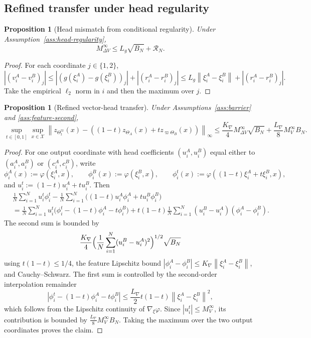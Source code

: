 \documentclass[11pt]{article}
\newtheorem{proposition}[theorem]{Proposition}
\theoremstyle{definition}
\newcommand{\norm}[1]{\left\lVert #1 \right\rVert}
\newcommand{\abs}[1]{\left\lvert #1 \right\rvert}
\newcommand{\mc}[1]{\mathcal{#1}}
\begin{document}
\subsection{Refined transfer under head regularity}

\begin{proposition}[Head mismatch from conditional regularity]
\label{prop:head-mismatch-regular}
Under Assumption~\ref{ass:head-regularity},
\begin{equation}
  M_{\Delta V}^\infty
  \le
  L_g\sqrt{B_N}+\mc{R}_N.
  \label{eq:head-mismatch-regular}
\end{equation}
\end{proposition}

\begin{proof}
For each coordinate $j\in\{1,2\}$,
\[
  \abs{(v_i^A-v_i^B)_j}
  \le
  \abs{(g(\xi_i^A)-g(\xi_i^B))_j}
  +
  \abs{(r_i^A-r_i^B)_j}
  \le
  L_g\norm{\xi_i^A-\xi_i^B}+\abs{(r_i^A-r_i^B)_j}.
\]
Take the empirical $\ell_2$ norm in $i$ and then the maximum over $j$.
\end{proof}

\begin{proposition}[Refined vector-head transfer]
\label{prop:refined-transfer}
Under Assumptions~\ref{ass:barrier} and \ref{ass:feature-second},
\begin{equation}
  \sup_{t\in[0,1]}\sup_{x\in\mc{X}}
  \norm{z_{\Theta_t^\varpi}(x)-((1-t)z_{\Theta_A}(x)+t z_{\varpi\Theta_B}(x))}_\infty
  \le
  \frac{K_\nabla}{4}M_{\Delta V}^\infty\sqrt{B_N}
  +
  \frac{L_\nabla}{8}M_V^\infty B_N.
  \label{eq:refined-transfer-bound}
\end{equation}
\end{proposition}

\begin{proof}
For one output coordinate with head coefficients $(u_i^A,u_i^B)$ equal either to
$(a_i^A,a_i^B)$ or $(c_i^A,c_i^B)$, write
\[
  \phi_i^A(x):=\varphi(\xi_i^A,x),
  \qquad
  \phi_i^B(x):=\varphi(\xi_i^B,x),
  \qquad
  \phi_i^t(x):=\varphi((1-t)\xi_i^A+t\xi_i^B,x),
\]
and $u_i^t:=(1-t)u_i^A+t u_i^B$. Then
\begin{align*}
  &\frac1N\sum_{i=1}^N u_i^t\phi_i^t
  -
  \frac1N\sum_{i=1}^N\bigl((1-t)u_i^A\phi_i^A+t u_i^B\phi_i^B\bigr)
  \\
  &=
  \frac1N\sum_{i=1}^N
  u_i^t\bigl(\phi_i^t-(1-t)\phi_i^A-t\phi_i^B\bigr)
  +
  t(1-t)\frac1N\sum_{i=1}^N
  (u_i^B-u_i^A)(\phi_i^A-\phi_i^B).
\end{align*}
The second sum is bounded by
\[
  \frac{K_\nabla}{4}
  \Bigl(\frac1N\sum_{i=1}^N (u_i^B-u_i^A)^2\Bigr)^{1/2}
  \sqrt{B_N}
\]
using $t(1-t)\le 1/4$, the feature Lipschitz bound
$\abs{\phi_i^A-\phi_i^B}\le K_\nabla\norm{\xi_i^A-\xi_i^B}$, and
Cauchy--Schwarz. The first sum is controlled by the second-order interpolation
remainder
\[
  \abs{\phi_i^t-(1-t)\phi_i^A-t\phi_i^B}
  \le
  \frac{L_\nabla}{2}t(1-t)\norm{\xi_i^A-\xi_i^B}^2,
\]
which follows from the Lipschitz continuity of $\nabla_\xi\varphi$. Since
$\abs{u_i^t}\le M_V^\infty$, its contribution is bounded by
$\frac{L_\nabla}{8}M_V^\infty B_N$. Taking the maximum over the two output
coordinates proves the claim.
\end{proof}
\end{document}
